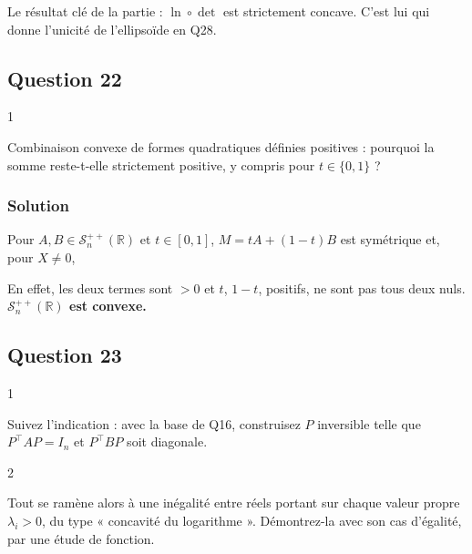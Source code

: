 \documentclass[11pt,a4paper]{article}
\newcommand{\equationajustee}[1]{%
  \sbox{\boiteequation}{$\displaystyle #1$}%
  \ifdim\wd\boiteequation>\linewidth
    \[\resizebox{\linewidth}{!}{\usebox{\boiteequation}}\]%
  \else
    \[#1\]%
  \fi}
\begin{document}
Le résultat clé de la partie : \(\ln\circ\det\) est strictement concave. C'est lui qui donne l'unicité de l'ellipsoïde en Q28.

\hypertarget{question-22}{%
\subsection{Question 22}\label{question-22}}

\begin{indication}{1}

Combinaison convexe de formes quadratiques définies positives : pourquoi la somme reste-t-elle strictement positive, y compris pour \(t\in\{0,1\}\) ?

\end{indication}

\hypertarget{solution-21}{%
\subsubsection{Solution}\label{solution-21}}

Pour \(A,B\in{\mathcal{S}}_n^{++}(\mathbb{R})\) et \(t\in[0,1]\), \(M=tA+(1-t)B\) est symétrique et, pour \(X\neq0\),

\equationajustee{(MX|X)=t(AX|X)+(1-t)(BX|X)>0.}

En effet, les deux termes sont \(>0\) et \(t\), \(1-t\), positifs, ne sont pas tous deux nuls. \textbf{\({\mathcal{S}}_n^{++}(\mathbb{R})\) est convexe.}

\hypertarget{question-23}{%
\subsection{Question 23}\label{question-23}}

\begin{indication}{1}

Suivez l'indication : avec la base de Q16, construisez \(P\) inversible telle que \(P^\top AP=I_n\) et \(P^\top BP\) soit diagonale.

\end{indication}

\begin{indication}{2}

Tout se ramène alors à une inégalité entre réels portant sur chaque valeur propre \(\lambda_i>0\), du type « concavité du logarithme ». Démontrez-la avec son cas d'égalité, par une étude de fonction.

\end{indication}
\end{document}
